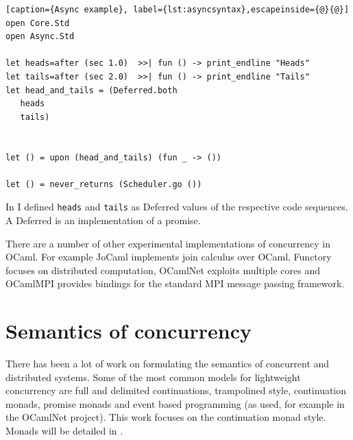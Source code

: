 \documentclass[12pt,twoside,notitlepage]{report}
\theoremstyle{plain}%
\theoremstyle{definition}
\theoremstyle{remark}
\begin{document}
\begin{minipage}{\linewidth}

\begin{lstlisting}[caption={Async example}, label={lst:asyncsyntax},escapeinside={@}{@}]
open Core.Std
open Async.Std

let heads=after (sec 1.0)  >>| fun () -> print_endline "Heads"
let tails=after (sec 2.0)  >>| fun () -> print_endline "Tails"
let head_and_tails = (Deferred.both
   heads
   tails)


let () = upon (head_and_tails) (fun _ -> ())
  
let () = never_returns (Scheduler.go ())
\end{lstlisting}

\end{minipage}



In  I defined \verb|heads| and \verb|tails| as Deferred values of the respective code sequences. A Deferred is an implementation of a promise.


There are a number of other experimental implementations of concurrency in OCaml. For example JoCaml\cite{jocaml} implements join calculus over OCaml, Functory\cite{functory} focuses on distributed computation, OCamlNet exploits multiple cores and OCamlMPI\cite{ocamlmpi} provides bindings for the standard MPI message passing framework.


\section{Semantics of concurrency}

There has been a lot of work on formulating the semantics of concurrent and distributed systems. Some of the most common models for lightweight concurrency\cite{deleuzelight} are full\cite{friedman1988applications,leroyocaml} and delimited\cite{kiselyov2010delimited} continuations\cite{shan2004shift}, trampolined style\cite{ganz1999trampolined}, continuation monads\cite{Claessen99functionalpearls}, promise monads\cite{liskov1988promises} and event based programming (as used, for example in the OCamlNet\cite{Ocamlnet} project). This work focuses on the continuation monad style. Monads will be detailed in .
\end{document}
